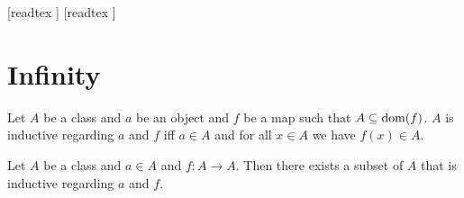 \documentclass[10pt]{article}
\begin{document}
  \begin{imports}
    \begin{forthel}
      [readtex ]
      [readtex ]
    \end{forthel}
  \end{imports}


  \section{Infinity}

  \begin{forthel}
    \begin{definition}
      Let $A$ be a class and $a$ be an object and $f$ be a map such that $A \subseteq \operatorname{dom}(f)$.
      $A$ is inductive regarding $a$ and $f$ iff $a \in A$ and for all $x \in A$ we have $f(x) \in A$.
    \end{definition}
  \end{forthel}

  \begin{forthel}
    \begin{axiom}
      Let $A$ be a class and $a \in A$ and $f : A \to A$.
      Then there exists a subset of $A$ that is inductive regarding $a$ and $f$.
    \end{axiom}
  \end{forthel}
\end{document}
